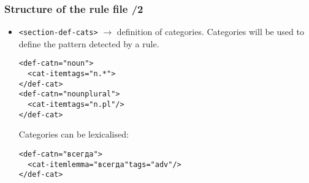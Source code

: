 \documentclass[10pt,xetex]{beamer} %
\begin{document}
\begin{frame}
\frametitle{Structure of the rule file /2}

\begin{itemize}
 \item \texttt{<section-def-cats>} $\rightarrow$ definition of categories. Categories will be used to define the pattern detected by a rule.
\begin{exampleblock}{}
\begin{small}
\begin{alltt}
  <def-cat n="noun">\\
  ~~<cat-item tags="n.*">\\
  </def-cat>\\
  <def-cat n="nounplural">\\
  ~~  <cat-item tags="n.pl"/>\\
  </def-cat>\\
\end{alltt}
\end{small}
\end{exampleblock}
Categories can be lexicalised:\\
\begin{exampleblock}{}
\begin{small}
\begin{alltt}
    <def-cat n="всегда">\\
     ~~ <cat-item lemma="всегда" tags="adv"/>\\
    </def-cat>\\
\end{alltt}
\end{small}
\end{exampleblock}
\end{itemize}
\end{frame}
\end{document}
